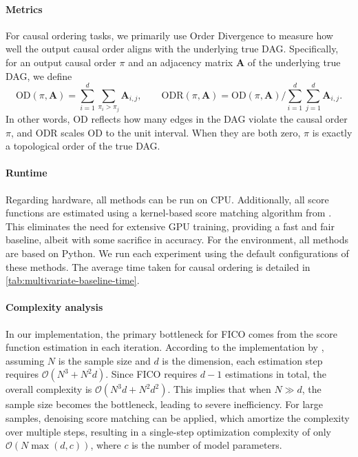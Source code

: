 \documentclass{article}
\theoremstyle{plain}
\theoremstyle{definition}
\theoremstyle{remark}
\begin{document}
\paragraph{Metrics}
For causal ordering tasks, we primarily use Order Divergence \citep{Rolland2022} to measure how well the output causal order aligns with the underlying true DAG. Specifically, for an output causal order $\pi$ and an adjacency matrix $\bm{A}$ of the underlying true DAG, we define
\[\text{OD}(\pi,\bm{A})=\sum_{i=1}^d\sum_{\pi_i>\pi_j}\bm{A}_{i,j},\qquad\text{ODR}(\pi,\bm{A})=\text{OD}(\pi,\bm{A})/\sum_{i=1}^d\sum_{j=1}^d\bm{A}_{i,j}.\]
In other words, OD reflects how many edges in the DAG violate the causal order $\pi$, and ODR scales OD to the unit interval. When they are both zero, $\pi$ is exactly a topological order of the true DAG.

\paragraph{Runtime}

Regarding hardware, all methods can be run on CPU. Additionally, all score functions are estimated using a kernel-based score matching algorithm from \citep{Rolland2022}. This eliminates the need for extensive GPU training, providing a fast and fair baseline, albeit with some sacrifice in accuracy. For the environment, all methods are based on Python. We run each experiment using the default configurations of these methods. The average time taken for causal ordering is detailed in \cref{tab:multivariate-baseline-time}.

\paragraph{Complexity analysis}

In our implementation, the primary bottleneck for FICO comes from the score function estimation in each iteration. According to the implementation by \citep{Rolland2022}, assuming $N$ is the sample size and $d$ is the dimension, each estimation step requires $\mathcal{O}(N^3+N^2d)$. Since FICO requires $d-1$ estimations in total, the overall complexity is $\mathcal{O}(N^3d+N^2d^2)$. This implies that when $N \gg d$, the sample size becomes the bottleneck, leading to severe inefficiency. For large samples, denoising score matching \citep{Sanchez2023} can be applied, which amortize the complexity over multiple steps, resulting in a single-step optimization complexity of only $\mathcal{O}(N\max(d,c))$, where $c$ is the number of model parameters.%
\newpage
\end{document}
